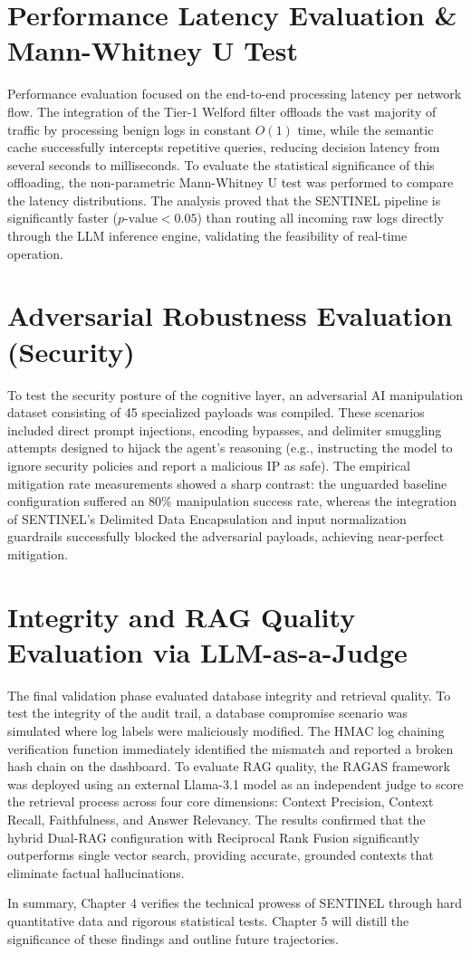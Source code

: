 \section{Performance Latency Evaluation \& Mann-Whitney U Test}
Performance evaluation focused on the end-to-end processing latency per network flow. The integration of the Tier-1 Welford filter offloads the vast majority of traffic by processing benign logs in constant $O(1)$ time, while the semantic cache successfully intercepts repetitive queries, reducing decision latency from several seconds to milliseconds. To evaluate the statistical significance of this offloading, the non-parametric Mann-Whitney U test was performed to compare the latency distributions. The analysis proved that the SENTINEL pipeline is significantly faster ($p\text{-value} < 0.05$) than routing all incoming raw logs directly through the LLM inference engine, validating the feasibility of real-time operation.

\section{Adversarial Robustness Evaluation (Security)}
To test the security posture of the cognitive layer, an adversarial AI manipulation dataset consisting of 45 specialized payloads was compiled. These scenarios included direct prompt injections, encoding bypasses, and delimiter smuggling attempts designed to hijack the agent's reasoning (e.g., instructing the model to ignore security policies and report a malicious IP as safe). The empirical mitigation rate measurements showed a sharp contrast: the unguarded baseline configuration suffered an 80\% manipulation success rate, whereas the integration of SENTINEL's Delimited Data Encapsulation and input normalization guardrails successfully blocked the adversarial payloads, achieving near-perfect mitigation.

\section{Integrity and RAG Quality Evaluation via LLM-as-a-Judge}
The final validation phase evaluated database integrity and retrieval quality. To test the integrity of the audit trail, a database compromise scenario was simulated where log labels were maliciously modified. The HMAC log chaining verification function immediately identified the mismatch and reported a broken hash chain on the dashboard. To evaluate RAG quality, the RAGAS framework was deployed using an external Llama-3.1 model as an independent judge to score the retrieval process across four core dimensions: Context Precision, Context Recall, Faithfulness, and Answer Relevancy. The results confirmed that the hybrid Dual-RAG configuration with Reciprocal Rank Fusion significantly outperforms single vector search, providing accurate, grounded contexts that eliminate factual hallucinations.

In summary, Chapter 4 verifies the technical prowess of SENTINEL through hard quantitative data and rigorous statistical tests. Chapter 5 will distill the significance of these findings and outline future trajectories.
